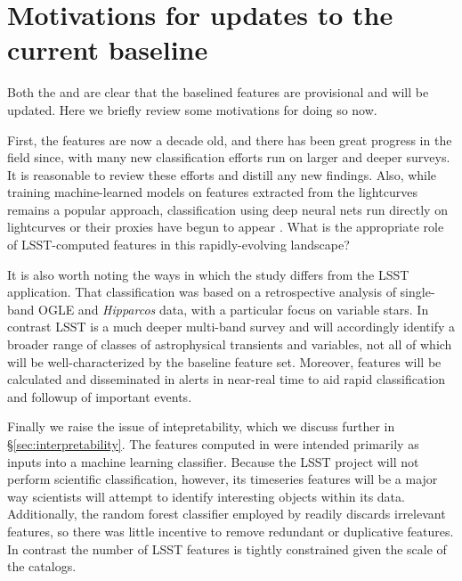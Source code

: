 \documentclass[DM,authoryear,toc]{lsstdoc}
\begin{document}
\section{Motivations for updates to the current baseline}

Both the \DPDD and  are clear that the baselined features are provisional and will be updated.
Here we briefly review some motivations for doing so now.

First, the \citet{2011ApJ...733...10R} features are now a decade old, and there has been great progress in the field since, with many new classification efforts run on larger and deeper surveys.
It is reasonable to review these efforts and distill any new findings.
Also, while training machine-learned models on features extracted from the lightcurves remains a popular approach, classification using deep neural nets run directly on lightcurves or their proxies have begun to appear \citep[e.g.,][]{Mahabal:17:DLClassification,Naul:18:RNNClassifier,Muthukrishna:19:RAPIDClassification}.
What is the appropriate role of LSST-computed features in this rapidly-evolving landscape?

It is also worth noting the ways in which the \citet{2011ApJ...733...10R} study differs from the LSST application.
That classification was based on a retrospective analysis of single-band OGLE and \textit{Hipparcos} data, with a particular focus on variable stars.
In contrast LSST is a much deeper multi-band survey and will accordingly identify a broader range of classes of astrophysical transients and variables, not all of which will be well-characterized by the baseline feature set.
Moreover, features will be calculated and disseminated in alerts in near-real time to aid rapid classification and followup of important events.

Finally we raise the issue of intepretability, which we discuss further in \S \ref{sec:interpretability}.
The features computed in \citet{2011ApJ...733...10R} were intended primarily as inputs into a machine learning classifier.
Because the LSST project will not perform scientific classification, however, its timeseries features will be a major way scientists will attempt to identify interesting objects within its data.
Additionally, the random forest classifier employed by \citet{2011ApJ...733...10R} readily discards irrelevant features, so there was little incentive to remove redundant or duplicative features.
In contrast the number of LSST features is tightly constrained given the scale of the catalogs.
\end{document}
